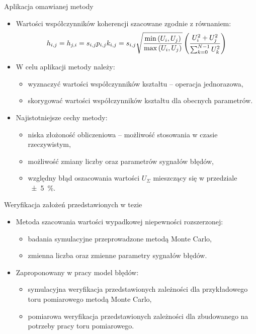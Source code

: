 \documentclass[12pt, polish, aspectratio = 169]{slides}
\begin{document}
\begin{frame}{Aplikacja omawianej metody}
\begin{itemize}
\item Wartości współczynników koherencji szacowane zgodnie z równaniem:
\begin{equation}
h_{i,j} = h_{j,i} = s_{i,j} p_{i,j} k_{i,j} = s_{i,j} \sqrt{\frac{\min \left(U_{i}, U_{j}\right)}{\max \left(U_{i}, U_{j}\right)}} \left( \frac{U_{i}^{2} + U_{j}^{2}}{\sum _{k = 0} ^{N-1} U_{k}^{2}} \right) \label{eq:unc_coher}
\end{equation}
\item W celu aplikacji metody należy:
	\begin{itemize}
	\item wyznaczyć wartości współczynników kształtu -- operacja jednorazowa,
	\item skorygować wartości współczynników kształtu dla obecnych parametrów.
	\end{itemize}
\item Najistotniejsze cechy metody:
	\begin{itemize}
	\item niska złożoność obliczeniowa -- możliwość stosowania w czasie rzeczywistym,
	\item możliwość zmiany liczby oraz parametrów sygnałów błędów,
	\item względny błąd oszacowania wartości $U_{\Sigma}$ mieszczący się w przedziale \qty{\pm 5}{\percent}.
	\end{itemize}
\end{itemize}
\end{frame}


\begin{frame}{Weryfikacja założeń przedstawionych w tezie}
\begin{itemize}
\item Metoda szacowania wartości wypadkowej niepewności rozszerzonej:
	\begin{itemize}
	\item badania symulacyjne przeprowadzone metodą Monte Carlo,
	\item zmienna liczba oraz zmienne parametry sygnałów błędów.
	\end{itemize}
\item Zaproponowany w pracy model błędów:
	\begin{itemize}
	\item symulacyjna weryfikacja przedstawionych zależności dla przykładowego toru pomiarowego metodą Monte Carlo,
	\item pomiarowa weryfikacja przedstawionych zależności dla zbudowanego na potrzeby pracy toru pomiarowego.
	\end{itemize}
\end{itemize}
\end{frame}
\end{document}
